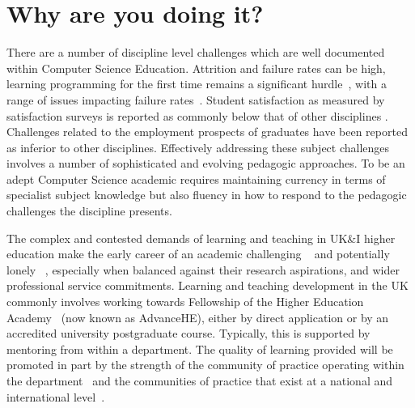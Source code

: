 \documentclass[sigconf]{acmart}
\begin{document}
\section{Why are you doing it?}
There are a number of discipline level challenges which are well documented within Computer Science Education. Attrition and failure rates can be high, learning programming for the first time remains a significant hurdle~\cite{davenport-et-al:latice2016,murphy-et-al:programming2017,simon-et-al:sigcse2018}, with a range of issues impacting failure rates~\cite{Watson:2014:FRI:2591708.2591749}. Student satisfaction as measured by satisfaction surveys is reported as commonly below that of other disciplines \cite{Sinclair2015}. Challenges related to the employment prospects of graduates have been reported as inferior to other disciplines\cite{shadbolt2016shadbolt}. Effectively addressing these subject challenges involves a number of sophisticated and evolving pedagogic approaches. To be an adept Computer Science academic requires maintaining currency in terms of specialist subject knowledge but also fluency in how to respond to the pedagogic challenges the discipline presents.

The complex and contested demands of learning and teaching in UK\&I higher education make the early career of an academic challenging ~\cite{Thomas2015} and potentially lonely ~\cite{Foote2009}, especially when balanced against their research aspirations, and wider professional service commitments. Learning and teaching development in the UK commonly involves working towards Fellowship of the Higher Education Academy~\cite{fellowship} (now known as AdvanceHE), either by direct application or by an accredited university postgraduate course. Typically, this is supported by mentoring from within a department. The quality of learning provided will be promoted in part by the strength of the community of practice operating within the department~\cite{Bolander2008} and the communities of practice that exist at a national and international level~\cite{Thomas2015}.
\end{document}
